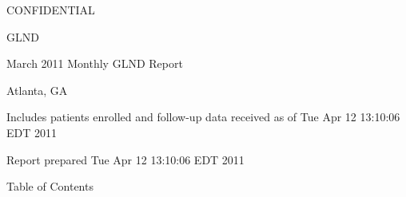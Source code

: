 \documentclass[dvips,10pt]{article}
\begin{document}
\vspace*{1in}
\begin{center}
{\Huge{CONFIDENTIAL}}
\end{center}
\vspace*{0.5in}
\begin{center}
{\Huge{GLND}}
\end{center}
\vspace*{0.25in}
\begin{center}
{\Huge{
March 2011 Monthly GLND Report
}}
\end{center}
\begin{center}
{\Huge{
 
}}
\end{center}
\begin{center}
{\Huge{Atlanta, GA}}
\end{center}
\vspace*{1in}
\begin{center}
\noindent
{\Large{Includes patients enrolled and follow-up data received as of Tue Apr 12 13:10:06 EDT 2011}}
\end{center}
\vspace*{0.5in}
\begin{center}
{\Large{Report prepared  Tue Apr 12 13:10:06 EDT 2011 }}
\end{center}
\clearpage
\vspace*{1in}
\begin{center}
{\Huge{Table of Contents}}
\end{center}
\listoftables
\listoffigures
\clearpage
\end{document}
